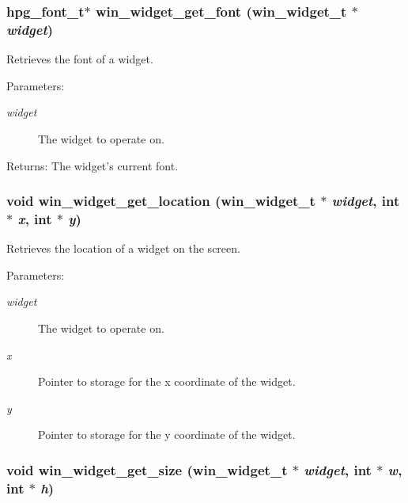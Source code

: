 \subsubsection{\setlength{\rightskip}{0pt plus 5cm}hpg\_\-font\_\-t$\ast$ win\_\-widget\_\-get\_\-font ({\bf win\_\-widget\_\-t} $\ast$ {\em widget})}\label{winwidget_8h_a16}


Retrieves the font of a widget. 

\begin{Desc}
\item[Parameters:]
\begin{description}
\item[{\em widget}]The widget to operate on. \end{description}
\end{Desc}
\begin{Desc}
\item[Returns:]The widget's current font. \end{Desc}
\subsubsection{\setlength{\rightskip}{0pt plus 5cm}void win\_\-widget\_\-get\_\-location ({\bf win\_\-widget\_\-t} $\ast$ {\em widget}, int $\ast$ {\em x}, int $\ast$ {\em y})}\label{winwidget_8h_a9}


Retrieves the location of a widget on the screen. 

\begin{Desc}
\item[Parameters:]
\begin{description}
\item[{\em widget}]The widget to operate on. \item[{\em x}]Pointer to storage for the x coordinate of the widget. \item[{\em y}]Pointer to storage for the y coordinate of the widget. \end{description}
\end{Desc}
\subsubsection{\setlength{\rightskip}{0pt plus 5cm}void win\_\-widget\_\-get\_\-size ({\bf win\_\-widget\_\-t} $\ast$ {\em widget}, int $\ast$ {\em w}, int $\ast$ {\em h})}\label{winwidget_8h_a11}


